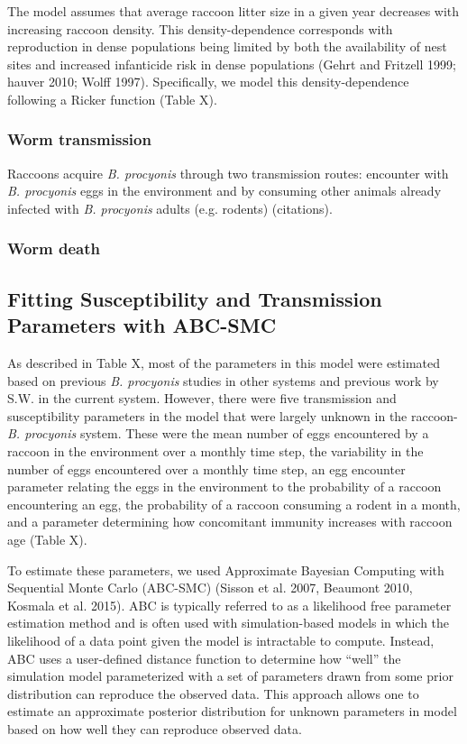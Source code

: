 \documentclass[11pt]{article}
\begin{document}
The model assumes that average raccoon litter size in a given year
decreases with increasing raccoon density. This density-dependence
corresponds with reproduction in dense populations being limited by both
the availability of nest sites and increased infanticide risk in dense
populations (Gehrt and Fritzell 1999; hauver 2010; Wolff 1997).
Specifically, we model this density-dependence following a Ricker
function (Table X).

\subsubsection{Worm transmission}

Raccoons acquire \emph{B. procyonis} through two transmission routes:
encounter with \emph{B. procyonis} eggs in the environment and by
consuming other animals already infected with \emph{B. procyonis} adults
(e.g. rodents) (citations).

\subsubsection{Worm death}

\subsection{Fitting Susceptibility and Transmission Parameters with ABC-SMC}

As described in Table X, most of the parameters in this model were
estimated based on previous \emph{B. procyonis} studies in other systems
and previous work by S.W. in the current system. However, there were
five transmission and susceptibility parameters in the model that were
largely unknown in the raccoon-\emph{B. procyonis} system. These were
the mean number of eggs encountered by a raccoon in the environment over
a monthly time step, the variability in the number of eggs encountered
over a monthly time step, an egg encounter parameter relating the eggs
in the environment to the probability of a raccoon encountering an egg,
the probability of a raccoon consuming a rodent in a month, and a
parameter determining how concomitant immunity increases with raccoon
age (Table X).

To estimate these parameters, we used Approximate Bayesian Computing
with Sequential Monte Carlo (ABC-SMC) (Sisson et al. 2007, Beaumont
2010, Kosmala et al. 2015). ABC is typically referred to as a likelihood
free parameter estimation method and is often used with simulation-based
models in which the likelihood of a data point given the model is
intractable to compute. Instead, ABC uses a user-defined distance
function to determine how ``well'' the simulation model parameterized
with a set of parameters drawn from some prior distribution can
reproduce the observed data. This approach allows one to estimate an
approximate posterior distribution for unknown parameters in model based
on how well they can reproduce observed data.
\end{document}
